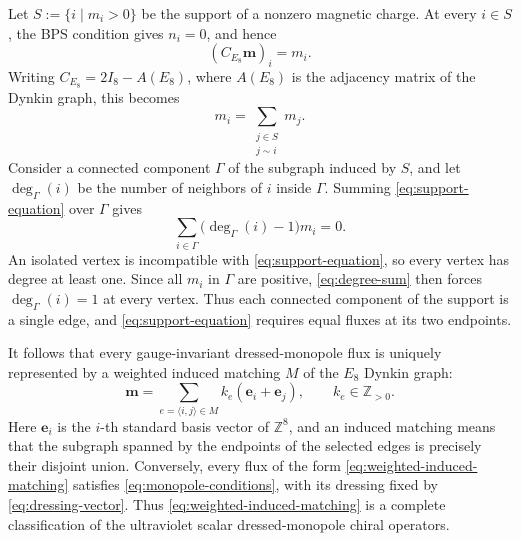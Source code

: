\documentclass[11pt,a4paper]{article}
\numberwithin{equation}{section}
\begin{document}
Let $S:=\{i\mid m_i>0\}$ be the support of a nonzero magnetic charge.  At every $i\in S$, the BPS condition gives $n_i=0$, and hence
\begin{equation}
  (C_{E_8}\boldsymbol m)_i=m_i.
\end{equation}
Writing $C_{E_8}=2I_8-A(E_8)$, where $A(E_8)$ is the adjacency matrix of the Dynkin graph, this becomes
\begin{equation}
  m_i=\sum_{\substack{j\in S\\j\sim i}}m_j.
  \label{eq:support-equation}
\end{equation}
Consider a connected component $\Gamma$ of the subgraph induced by $S$, and let $\deg_\Gamma(i)$ be the number of neighbors of $i$ inside $\Gamma$.  Summing \eqref{eq:support-equation} over $\Gamma$ gives
\begin{equation}
  \sum_{i\in\Gamma}\bigl(\deg_\Gamma(i)-1\bigr)m_i=0.
  \label{eq:degree-sum}
\end{equation}
An isolated vertex is incompatible with \eqref{eq:support-equation}, so every vertex has degree at least one.  Since all $m_i$ in $\Gamma$ are positive, \eqref{eq:degree-sum} then forces $\deg_\Gamma(i)=1$ at every vertex.  Thus each connected component of the support is a single edge, and \eqref{eq:support-equation} requires equal fluxes at its two endpoints.

It follows that every gauge-invariant dressed-monopole flux is uniquely represented by a weighted induced matching $M$ of the $E_8$ Dynkin graph:
\begin{equation}
  \boldsymbol m
  =\sum_{e=\langle i,j\rangle\in M}
  k_e(\boldsymbol e_i+\boldsymbol e_j),
  \qquad
  k_e\in\mathbb Z_{>0}.
  \label{eq:weighted-induced-matching}
\end{equation}
Here $\boldsymbol e_i$ is the $i$-th standard basis vector of $\mathbb Z^8$, and an induced matching means that the subgraph spanned by the endpoints of the selected edges is precisely their disjoint union.  Conversely, every flux of the form \eqref{eq:weighted-induced-matching} satisfies \eqref{eq:monopole-conditions}, with its dressing fixed by \eqref{eq:dressing-vector}.  Thus \eqref{eq:weighted-induced-matching} is a complete classification of the ultraviolet scalar dressed-monopole chiral operators.
\end{document}
